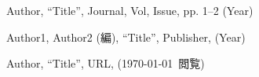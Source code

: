 

\begin{thebibliography}{9}

    \renewcommand{\baselinestretch}{1.0}
    \small

        Author,  
        ``Title'', 
        Journal, Vol, Issue, pp. 1--2 (Year)

        Author1, Author2 (編), 
        ``Title'', Publisher, (Year)

        Author,
        ``Title'', 
        URL, 
        (\today\ 閲覧)
        
\end{thebibliography}
